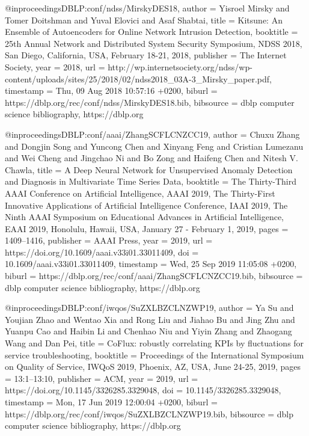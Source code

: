 @inproceedings{DBLP:conf/ndss/MirskyDES18,
  author    = {Yisroel Mirsky and
               Tomer Doitshman and
               Yuval Elovici and
               Asaf Shabtai},
  title     = {Kitsune: An Ensemble of Autoencoders for Online Network Intrusion
               Detection},
  booktitle = {25th Annual Network and Distributed System Security Symposium, {NDSS}
               2018, San Diego, California, USA, February 18-21, 2018},
  publisher = {The Internet Society},
  year      = {2018},
  url       = {http://wp.internetsociety.org/ndss/wp-content/uploads/sites/25/2018/02/ndss2018\_03A-3\_Mirsky\_paper.pdf},
  timestamp = {Thu, 09 Aug 2018 10:57:16 +0200},
  biburl    = {https://dblp.org/rec/conf/ndss/MirskyDES18.bib},
  bibsource = {dblp computer science bibliography, https://dblp.org}
}

@inproceedings{DBLP:conf/aaai/ZhangSCFLCNZCC19,
  author    = {Chuxu Zhang and
               Dongjin Song and
               Yuncong Chen and
               Xinyang Feng and
               Cristian Lumezanu and
               Wei Cheng and
               Jingchao Ni and
               Bo Zong and
               Haifeng Chen and
               Nitesh V. Chawla},
  title     = {A Deep Neural Network for Unsupervised Anomaly Detection and Diagnosis
               in Multivariate Time Series Data},
  booktitle = {The Thirty-Third {AAAI} Conference on Artificial Intelligence, {AAAI}
               2019, The Thirty-First Innovative Applications of Artificial Intelligence
               Conference, {IAAI} 2019, The Ninth {AAAI} Symposium on Educational
               Advances in Artificial Intelligence, {EAAI} 2019, Honolulu, Hawaii,
               USA, January 27 - February 1, 2019},
  pages     = {1409--1416},
  publisher = {{AAAI} Press},
  year      = {2019},
  url       = {https://doi.org/10.1609/aaai.v33i01.33011409},
  doi       = {10.1609/aaai.v33i01.33011409},
  timestamp = {Wed, 25 Sep 2019 11:05:08 +0200},
  biburl    = {https://dblp.org/rec/conf/aaai/ZhangSCFLCNZCC19.bib},
  bibsource = {dblp computer science bibliography, https://dblp.org}
}

@inproceedings{DBLP:conf/iwqos/SuZXLBZCLNZWP19,
  author    = {Ya Su and
               Youjian Zhao and
               Wentao Xia and
               Rong Liu and
               Jiahao Bu and
               Jing Zhu and
               Yuanpu Cao and
               Haibin Li and
               Chenhao Niu and
               Yiyin Zhang and
               Zhaogang Wang and
               Dan Pei},
  title     = {CoFlux: robustly correlating KPIs by fluctuations for service troubleshooting},
  booktitle = {Proceedings of the International Symposium on Quality of Service,
               IWQoS 2019, Phoenix, AZ, USA, June 24-25, 2019},
  pages     = {13:1--13:10},
  publisher = {{ACM}},
  year      = {2019},
  url       = {https://doi.org/10.1145/3326285.3329048},
  doi       = {10.1145/3326285.3329048},
  timestamp = {Mon, 17 Jun 2019 12:00:04 +0200},
  biburl    = {https://dblp.org/rec/conf/iwqos/SuZXLBZCLNZWP19.bib},
  bibsource = {dblp computer science bibliography, https://dblp.org}
}

